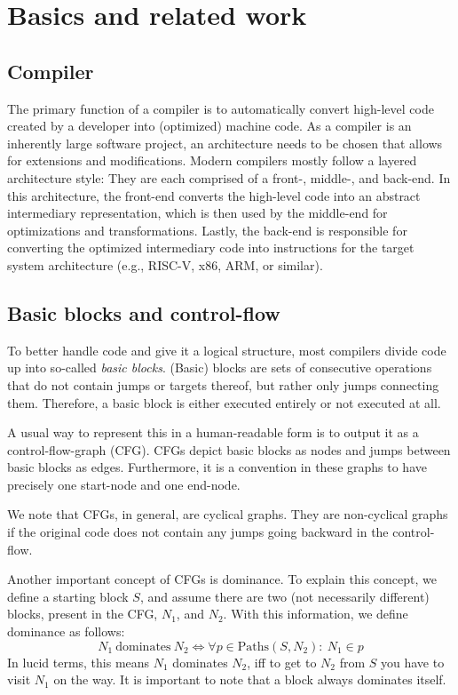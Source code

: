 \chapter{Basics and related work}\label{sec:basics}

\section{Compiler}\label{sec:basics:compiler}

The primary function of a compiler is to automatically convert high-level code created by a developer into (optimized) machine code.
As a compiler is an inherently large software project, an architecture needs to be chosen that allows for extensions and modifications.
Modern compilers mostly follow a layered architecture style: They are each comprised of a front-, middle-, and back-end.
In this architecture, the front-end converts the high-level code into an abstract intermediary representation, which is then used by the middle-end for optimizations and transformations.
Lastly, the back-end is responsible for converting the optimized intermediary code into instructions for the target system architecture (e.g., RISC-V, x86, ARM, or similar).

\section{Basic blocks and control-flow}\label{sec:basics:bb-cf}

To better handle code and give it a logical structure, most compilers divide code up into so-called \textit{basic blocks}.
(Basic) blocks are sets of consecutive operations that do not contain jumps or targets thereof, but rather only jumps connecting them.
Therefore, a basic block is either executed entirely or not executed at all.

A usual way to represent this in a human-readable form is to output it as a control-flow-graph (CFG).
CFGs depict basic blocks as nodes and jumps between basic blocks as edges.
Furthermore, it is a convention in these graphs to have precisely one start-node and one end-node.

We note that CFGs, in general, are cyclical graphs.
They are non-cyclical graphs if the original code does not contain any jumps going backward in the control-flow.

Another important concept of CFGs is dominance.
To explain this concept, we define a starting block $S$, and assume there are two (not necessarily different) blocks, present in the CFG, $N_1$, and $N_2$.
With this information, we define dominance as follows:
$$N_1~\text{dominates}~N_2 \Longleftrightarrow \forall p \in \text{Paths}(S, N_2):~N_1 \in p$$
In lucid terms, this means $N_1$ dominates $N_2$, iff to get to $N_2$ from $S$ you have to visit $N_1$ on the way.
It is important to note that a block always dominates itself.

